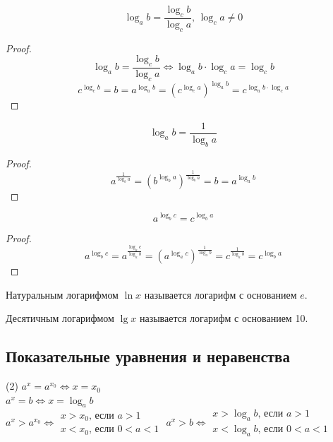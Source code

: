 \documentclass[12pt]{article}
\begin{document}
    \begin{statement}
        $$\log_ab=\frac{\log_cb}{\log_ca},\,\log_ca\neq0$$
    \end{statement}
    \begin{proof}
        $$\log_ab=\frac{\log_cb}{\log_ca}\Longleftrightarrow\log_ab\cdot\log_ca=\log_cb$$
        $$c^{\log_cb}=b=a^{\log_ab}=\left(c^{\log_ca}\right)^{\log_ab}=c^{\log_ab\cdot\log_ca}$$
    \end{proof}
    \begin{statement}
        $$\log_ab=\frac{1}{\log_ba}$$
    \end{statement}
    \begin{proof}
        $$a^{\frac{1}{\log_ba}}=\left(b^{\log_ba}\right)^{\frac{1}{\log_ba}}=b=a^{\log_ab}$$
    \end{proof}
    \begin{statement}
        $$a^{\log_bc}=c^{\log_ba}$$
    \end{statement}
    \begin{proof}
        $$a^{\log_bc}=a^{\frac{\log_ac}{\log_ab}}=\left(a^{\log_ac}\right)^{\frac{1}{\log_ab}}=c^\frac{1}{\log_ab}=c^{\log_ba}$$
    \end{proof}
    \begin{definition}
        Натуральным логарифмом $\ln x$ называется логарифм с основанием $e$.
    \end{definition}
    \begin{definition}
        Десятичным логарифмом $\lg x$ называется логарифм с основанием 10.
    \end{definition}

    \subsection{Показательные уравнения и неравенства}

    \begin{tasks}(2)
    \task[] $a^x=a^{x_0}\Longleftrightarrow x=x_0$\\
    \task[] $a^x=b\Longleftrightarrow x=\log_ab$\\
    \task[] $a^x>a^{x_0}\Longleftrightarrow\begin{array}{l}
        x>x_0\text{, если }a>1\\
        x<x_0\text{, если }0<a<1
    \end{array}$
    \task[] $a^x>b\Longleftrightarrow\begin{array}{l}
        x>\log_ab\text{, если }a>1\\
        x<\log_ab\text{, если }0<a<1
    \end{array}$
    \end{tasks}
\end{document}
